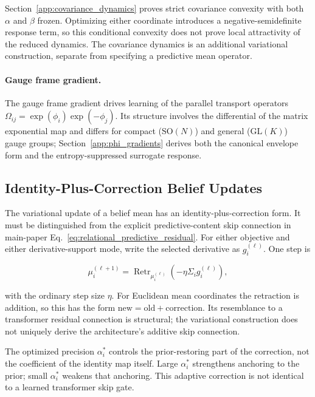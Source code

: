 \documentclass[twoside,11pt]{article}
\begin{document}
Section~\ref{app:covariance_dynamics} proves strict covariance convexity with both $\alpha$ and $\beta$ frozen. Optimizing either coordinate introduces a negative-semidefinite response term, so this conditional convexity does not prove local attractivity of the reduced dynamics. The covariance dynamics is an additional variational construction, separate from specifying a predictive mean operator.

\paragraph{Gauge frame gradient.}
The gauge frame gradient drives learning of the parallel transport operators $\Omega_{ij}=\exp(\phi_i)\exp(-\phi_j)$. Its structure involves the differential of the matrix exponential map and differs for compact ($\mathrm{SO}(N)$) and general ($\mathrm{GL}(K)$) gauge groups; Section~\ref{app:phi_gradients} derives both the canonical envelope form and the entropy-suppressed surrogate response.

\subsection{Identity-Plus-Correction Belief Updates}
\label{sec:residual_connections}

The variational update of a belief mean has an identity-plus-correction form. It must be distinguished from the explicit predictive-content skip connection in main-paper Eq.~\eqref{eq:relational_predictive_residual}. For either objective and either derivative-support mode, write the selected derivative as $g_i^{(\ell)}$. One step is

\begin{equation}
\mu_i^{(\ell+1)}
=\operatorname{Retr}_{\mu_i^{(\ell)}}
\left(-\eta\Sigma_i g_i^{(\ell)}\right),
\label{eq:residual_gradient_flow}
\end{equation}

with the ordinary step size $\eta$. For Euclidean mean coordinates the retraction is addition, so this has the form $\text{new}=\text{old}+\text{correction}$. Its resemblance to a transformer residual connection is structural; the variational construction does not uniquely derive the architecture's additive skip connection.

The optimized precision $\alpha_i^*$ controls the prior-restoring part of the correction, not the coefficient of the identity map itself. Large $\alpha_i^*$ strengthens anchoring to the prior; small $\alpha_i^*$ weakens that anchoring. This adaptive correction is not identical to a learned transformer skip gate.
\end{document}
